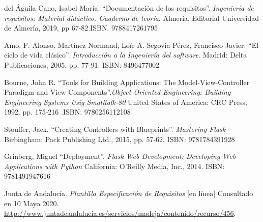 \documentclass[11pt,spanish,listoffigures,listoftables]{tfgetsinf}
\begin{document}
\begin{thebibliography}{10}



	del Águila Cano, Isabel María.
	\newblock ``Documentación de los requisitos''. \textit{Ingeniería de requisitos: Material didáctico. Cuaderno de teoría}.
	\newblock Almería, Editorial Universidad de Almería, 2019, pp 67-82.ISBN: 9788417261795

	Amo, F. Alonso. Martínez Normand, Loïc A. Segovia Pérez, Francisco Javier.
	\newblock ``El ciclo de vida clásico''. \textit{Introducción a la Ingeniería del software}.
	\newblock Madrid: Delta Publicaciones, 2005, pp. 77-91. ISBN: 8496477002
	
	Bourne, John R.
	\newblock ``Tools for Building Applications: The Model-View-Controller Paradigm and View Components''.\textit{Object-Oriented Engineering: Building Engineering Systems Usig Smalltalk-80}
	\newblock United States of America: CRC Press, 1992. pp. 175-216 .ISBN: 9780256112108
	
	Stouffer, Jack.
	\newblock ``Creating Controllers with Blueprints''. \textit{Mastering Flask}
	\newblock Birbingham: Pack Publishing Ltd., 2015, pp. 57-62. ISBN: 9781784391928
	
	
	Grinberg, Miguel
	\newblock ``Deployment''. \textit{Flask Web Development: Developing Web Applications with Python}
	\newblock California: O'Reilly Media, Inc., 2014. ISBN: 9781491947616
	


   Junta de Andalucía. \textit{Plantilla Especificación de Requisitos} [en línea]
   \newblock Consultado en 10 Mayo 2020.
   \url{http://www.juntadeandalucia.es/servicios/madeja/contenido/recurso/456}.


\end{thebibliography}
\end{document}
